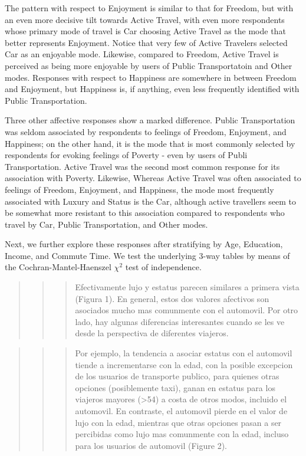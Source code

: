 \documentclass[]{elsarticle} %
\begin{document}
The pattern with respect to Enjoyment is similar to that for Freedom,
but with an even more decisive tilt towards Active Travel, with even
more respondents whose primary mode of travel is Car choosing Active
Travel as the mode that better represents Enjoyment. Notice that very
few of Active Travelers selected Car as an enjoyable mode. Likewise,
compared to Freedom, Active Travel is perceived as being more enjoyable
by users of Public Transportatoin and Other modes. Responses with
respect to Happiness are somewhere in between Freedom and Enjoyment, but
Happiness is, if anything, even less frequently identified with Public
Transportation.

Three other affective responses show a marked difference. Public
Transportation was seldom associated by respondents to feelings of
Freedom, Enjoyment, and Happiness; on the other hand, it is the mode
that is most commonly selected by respondents for evoking feelings of
Poverty - even by users of Publi Transportation. Active Travel was the
second most common response for its association with Poverty. Likewise,
Whereas Active Travel was often associated to feelings of Freedom,
Enjoyment, and Happiness, the mode most frequently associated with
Luxury and Status is the Car, although active travellers seem to be
somewhat more resistant to this association compared to respondents who
travel by Car, Public Transportation, and Other modes.

Next, we further explore these responses after stratifying by Age,
Education, Income, and Commute Time. We test the underlying 3-way tables
by means of the Cochran-Mantel-Haenszel \(\chi^2\) test of independence.

\begin{quote}
\begin{quote}
\begin{quote}
Efectivamente lujo y estatus parecen similares a primera vista (Figura
1). En general, estos dos valores afectivos son asociados mucho mas
comunmente con el automovil. Por otro lado, hay algunas diferencias
interesantes cuando se les ve desde la perspectiva de diferentes
viajeros.
\end{quote}
\end{quote}
\end{quote}

\begin{quote}
\begin{quote}
\begin{quote}
Por ejemplo, la tendencia a asociar estatus con el automovil tiende a
incrementarse con la edad, con la posible excepcion de los usuarios de
transporte publico, para quienes otras opciones (posiblemente taxi),
ganan en estatus para los viajeros mayores (\textgreater54) a costa de
otros modos, incluido el automovil. En contraste, el automovil pierde en
el valor de lujo con la edad, mientras que otras opciones pasan a ser
percibidas como lujo mas comunmente con la edad, incluso para los
usuarios de automovil (Figure 2).
\end{quote}
\end{quote}
\end{quote}
\end{document}
